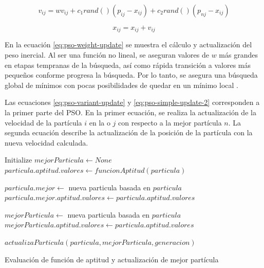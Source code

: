 \documentclass[letterpaper]{report}
\begin{document}
    \begin{equation}
      v_{ij} = w v_{ij} + c_1 rand()(p_{ij} - x_{ij}) + c_2 rand()(p_{nj}
        - x_{ij})
      \label{eq:pso-variant-update}
    \end{equation}

    \begin{equation}
      x_{ij} = x_{ij} + v_{ij}
      \label{eq:pso-simple-update-2}
    \end{equation}

    En la ecuación \ref{eq:pso-weight-update} se muestra el cálculo y
    actualización del peso inercial. Al ser una función no lineal, se aseguran
    valores de $w$ más grandes en etapas tempranas de la búsqueda, así como
    rápida transición a valores más pequeños conforme progresa la búsqueda. Por
    lo tanto, se asegura una búsqueda global de mínimos con pocas posibilidades
    de quedar en un mínimo local \cite{APSO2016}. 

    Las ecuaciones \ref{eq:pso-variant-update} y \ref{eq:pso-simple-update-2}
    corresponden a la primer parte del PSO. En la primer ecuación, se realiza la
    actualización de la velocidad de la partícula $i$ en la o $j$ con
    respecto a la mejor partícula $n$. La segunda ecuación describe la
    actualización de la posición de la partícula con la nueva velocidad
    calculada.

    \begin{algorithm}[ht!]
      \begin{algorithmic}
        \State Initialize $mejorParticula \gets None$
            \State $particula.aptitud.valores \gets funcionAptitud(particula)$

              \State $particula.mejor \gets$ nueva particula basada en $particula$
              \State $particula.mejor.aptitud.valores \gets particula.aptitud.valores$
            \EndIf

              \State $mejorParticula \gets$ nueva particula basada en $particula$
              \State $mejorParticula.aptitud.valores \gets particula.aptitud.valores$
            \EndIf
          \EndFor 

            \State $actualizaParticula(particula, mejorParticula, generacion)$
          \EndFor
        \EndFor
        \caption{Evaluación de función de aptitud y actualización de mejor
          partícula}
        \label{alg:pso-variant-eval}
      \end{algorithmic}
    \end{algorithm}
\end{document}
